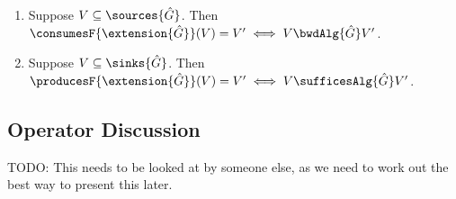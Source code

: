 \begin{theorem}
   \item
   \begin{enumerate}
   \item Suppose $V \subseteq \sources{\hat{G}}$. Then $\consumesF{\extension{\hat{G}}}(V) = V' \iff V \bwdAlg{\hat{G}} V'$.
   \item Suppose $V \subseteq \sinks{\hat{G}}$. Then $\producesF{\extension{\hat{G}}}(V) = V' \iff V \sufficesAlg{\hat{G}} V'$.
   \end{enumerate}
\end{theorem}



\subsection{Operator Discussion}
TODO: This needs to be looked at by someone else, as we need to work out the best way to present this later.
